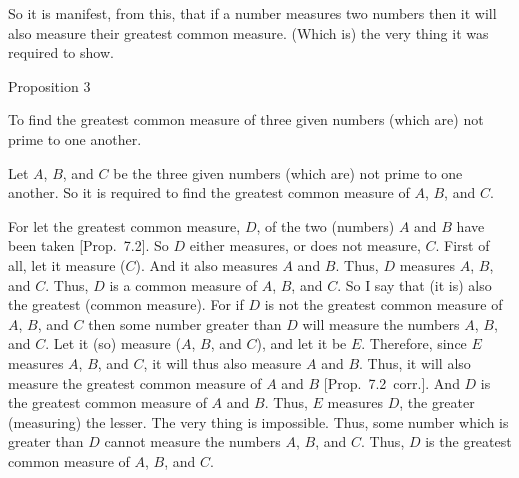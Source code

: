 So  it is manifest, from this, that if a number measures two numbers then
it will also measure their greatest common measure. (Which is) the
very thing it was required to show.


\begin{center}
{\large Proposition 3}
\end{center}

To find the greatest common measure of three given
numbers (which are) not prime to one another.

\epsfysize=2in
\centerline{}

Let $A$, $B$,  and $C$ be the three given numbers (which are) not prime to one another. So it is
required to find the greatest common measure of $A$, $B$,  and $C$.

For let the greatest common measure, $D$, of the two (numbers) $A$ and $B$ have been taken [Prop.~7.2]. So $D$ either measures, or
does not measure, $C$. First of all, let it measure ($C$). And it also measures
$A$ and $B$. Thus, $D$ measures $A$, $B$, and $C$. Thus, $D$ is a common measure
of $A$, $B$,  and $C$. So I say that (it is) also the greatest (common measure).
For if $D$ is not the greatest common measure of $A$, $B$,  and $C$ then some number
greater than $D$ will measure the numbers $A$, $B$,  and $C$. Let it (so) measure ($A$, $B$, and $C$),
and let it be $E$. Therefore, since $E$ measures $A$, $B$,  and $C$, it will thus
also measure $A$ and $B$. Thus, it will also measure the greatest common
measure of $A$ and $B$ [Prop.~7.2~corr.].
And $D$ is the greatest common measure of $A$ and $B$. Thus, $E$ measures
$D$, the greater (measuring) the lesser. The very thing is impossible.
Thus, some number which is greater than $D$ cannot measure the numbers $A$, $B$,  and $C$. Thus, $D$ is the greatest common measure of $A$, $B$, and $C$.

